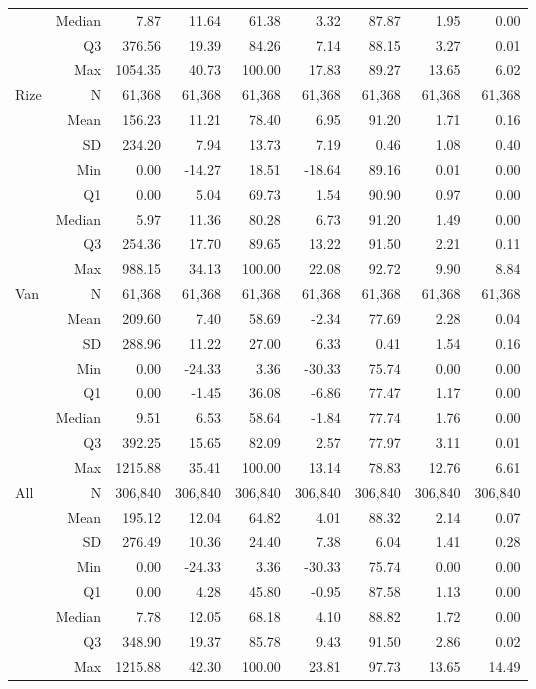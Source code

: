 \begin{table}[htbp]
\begin{tabular}{lrrrrrrrr}
 & Median & 7.87 & 11.64 & 61.38 & 3.32 & 87.87 & 1.95 & 0.00 \\
 & Q3 & 376.56 & 19.39 & 84.26 & 7.14 & 88.15 & 3.27 & 0.01 \\
 & Max & 1054.35 & 40.73 & 100.00 & 17.83 & 89.27 & 13.65 & 6.02 \\
Rize & N & 61,368 & 61,368 & 61,368 & 61,368 & 61,368 & 61,368 & 61,368 \\
 & Mean & 156.23 & 11.21 & 78.40 & 6.95 & 91.20 & 1.71 & 0.16 \\
 & SD & 234.20 & 7.94 & 13.73 & 7.19 & 0.46 & 1.08 & 0.40 \\
 & Min & 0.00 & -14.27 & 18.51 & -18.64 & 89.16 & 0.01 & 0.00 \\
 & Q1 & 0.00 & 5.04 & 69.73 & 1.54 & 90.90 & 0.97 & 0.00 \\
 & Median & 5.97 & 11.36 & 80.28 & 6.73 & 91.20 & 1.49 & 0.00 \\
 & Q3 & 254.36 & 17.70 & 89.65 & 13.22 & 91.50 & 2.21 & 0.11 \\
 & Max & 988.15 & 34.13 & 100.00 & 22.08 & 92.72 & 9.90 & 8.84 \\
Van & N & 61,368 & 61,368 & 61,368 & 61,368 & 61,368 & 61,368 & 61,368 \\
 & Mean & 209.60 & 7.40 & 58.69 & -2.34 & 77.69 & 2.28 & 0.04 \\
 & SD & 288.96 & 11.22 & 27.00 & 6.33 & 0.41 & 1.54 & 0.16 \\
 & Min & 0.00 & -24.33 & 3.36 & -30.33 & 75.74 & 0.00 & 0.00 \\
 & Q1 & 0.00 & -1.45 & 36.08 & -6.86 & 77.47 & 1.17 & 0.00 \\
 & Median & 9.51 & 6.53 & 58.64 & -1.84 & 77.74 & 1.76 & 0.00 \\
 & Q3 & 392.25 & 15.65 & 82.09 & 2.57 & 77.97 & 3.11 & 0.01 \\
 & Max & 1215.88 & 35.41 & 100.00 & 13.14 & 78.83 & 12.76 & 6.61 \\
All & N & 306,840 & 306,840 & 306,840 & 306,840 & 306,840 & 306,840 & 306,840 \\
 & Mean & 195.12 & 12.04 & 64.82 & 4.01 & 88.32 & 2.14 & 0.07 \\
 & SD & 276.49 & 10.36 & 24.40 & 7.38 & 6.04 & 1.41 & 0.28 \\
 & Min & 0.00 & -24.33 & 3.36 & -30.33 & 75.74 & 0.00 & 0.00 \\
 & Q1 & 0.00 & 4.28 & 45.80 & -0.95 & 87.58 & 1.13 & 0.00 \\
 & Median & 7.78 & 12.05 & 68.18 & 4.10 & 88.82 & 1.72 & 0.00 \\
 & Q3 & 348.90 & 19.37 & 85.78 & 9.43 & 91.50 & 2.86 & 0.02 \\
 & Max & 1215.88 & 42.30 & 100.00 & 23.81 & 97.73 & 13.65 & 14.49 \\
\hline
\end{tabular}
\end{table}
